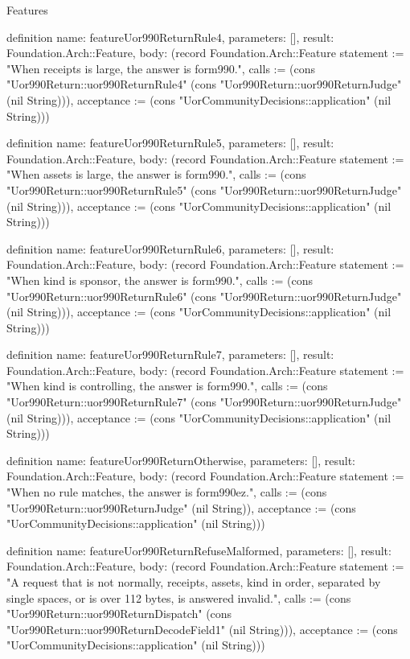 \begin{lexlean}{Features}
\begin{semanticmodule}
definition{
  name: featureUor990ReturnRule4,
  parameters: [],
  result: Foundation.Arch::Feature,
  body: (record Foundation.Arch::Feature {statement := "When receipts is large, the answer is form990.", calls := (cons "Uor990Return::uor990ReturnRule4" (cons "Uor990Return::uor990ReturnJudge" (nil String))), acceptance := (cons "UorCommunityDecisions::application" (nil String))})
}

definition{
  name: featureUor990ReturnRule5,
  parameters: [],
  result: Foundation.Arch::Feature,
  body: (record Foundation.Arch::Feature {statement := "When assets is large, the answer is form990.", calls := (cons "Uor990Return::uor990ReturnRule5" (cons "Uor990Return::uor990ReturnJudge" (nil String))), acceptance := (cons "UorCommunityDecisions::application" (nil String))})
}

definition{
  name: featureUor990ReturnRule6,
  parameters: [],
  result: Foundation.Arch::Feature,
  body: (record Foundation.Arch::Feature {statement := "When kind is sponsor, the answer is form990.", calls := (cons "Uor990Return::uor990ReturnRule6" (cons "Uor990Return::uor990ReturnJudge" (nil String))), acceptance := (cons "UorCommunityDecisions::application" (nil String))})
}

definition{
  name: featureUor990ReturnRule7,
  parameters: [],
  result: Foundation.Arch::Feature,
  body: (record Foundation.Arch::Feature {statement := "When kind is controlling, the answer is form990.", calls := (cons "Uor990Return::uor990ReturnRule7" (cons "Uor990Return::uor990ReturnJudge" (nil String))), acceptance := (cons "UorCommunityDecisions::application" (nil String))})
}

definition{
  name: featureUor990ReturnOtherwise,
  parameters: [],
  result: Foundation.Arch::Feature,
  body: (record Foundation.Arch::Feature {statement := "When no rule matches, the answer is form990ez.", calls := (cons "Uor990Return::uor990ReturnJudge" (nil String)), acceptance := (cons "UorCommunityDecisions::application" (nil String))})
}

definition{
  name: featureUor990ReturnRefuseMalformed,
  parameters: [],
  result: Foundation.Arch::Feature,
  body: (record Foundation.Arch::Feature {statement := "A request that is not normally, receipts, assets, kind in order, separated by single spaces, or is over 112 bytes, is answered invalid.", calls := (cons "Uor990Return::uor990ReturnDispatch" (cons "Uor990Return::uor990ReturnDecodeField1" (nil String))), acceptance := (cons "UorCommunityDecisions::application" (nil String))})
}


\end{semanticmodule}
\end{lexlean}
